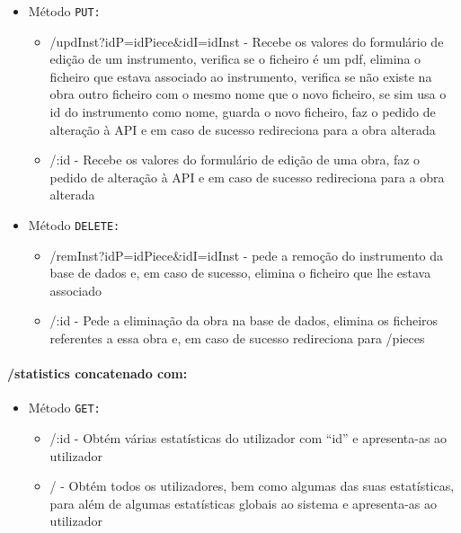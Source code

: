 \begin{itemize}
\begin{itemize}
                \end{itemize}
            \item Método \texttt{PUT:}
                \begin{itemize}
                    \item /updInst?idP=idPiece\&idI=idInst - Recebe os valores do formulário de edição de um instrumento, verifica se o ficheiro é um pdf, elimina o ficheiro que estava associado ao instrumento, verifica se não existe na obra outro ficheiro com o mesmo nome que o novo ficheiro, se sim usa o id do instrumento como nome, guarda o novo ficheiro, faz o pedido de alteração à API e em caso de sucesso redireciona para a obra alterada
                    \item /:id - Recebe os valores do formulário de edição de uma obra, faz o pedido de alteração à API e em caso de sucesso redireciona para a obra alterada
                \end{itemize}
            \item Método \texttt{DELETE:}
                \begin{itemize}
                    \item /remInst?idP=idPiece\&idI=idInst - pede a remoção do instrumento da base de dados e, em caso de sucesso, elimina o ficheiro que lhe estava associado
                    \item /:id - Pede a eliminação da obra na base de dados, elimina os ficheiros referentes a essa obra e, em caso de sucesso redireciona para /pieces
                \end{itemize}
        \end{itemize}

\paragraph{/statistics concatenado com:}
        \begin{itemize}
            \item Método \texttt{GET:}
                \begin{itemize}
                    \item /:id - Obtém várias estatísticas do utilizador com ``id'' e apresenta-as ao utilizador
                    \item / - Obtém todos os utilizadores, bem como algumas das suas estatísticas, para além de algumas estatísticas globais ao sistema e apresenta-as ao utilizador
                \end{itemize}
        \end{itemize}

